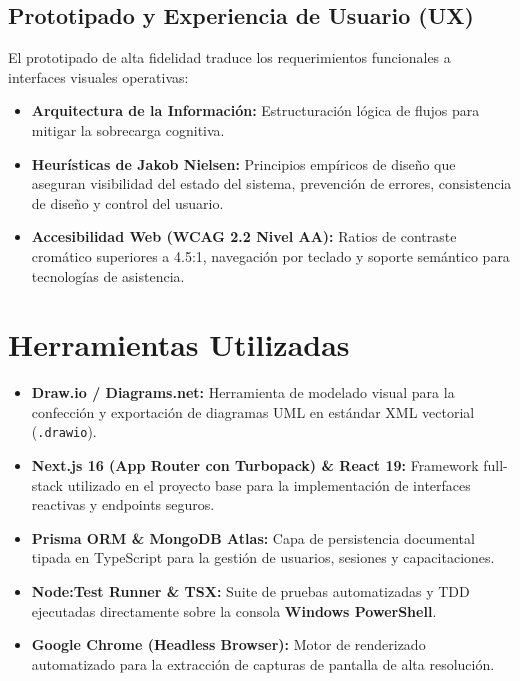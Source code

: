 \documentclass[11pt,a4paper]{article}
\begin{document}
\subsection{Prototipado y Experiencia de Usuario (UX)}
El prototipado de alta fidelidad traduce los requerimientos funcionales a interfaces visuales operativas:
\begin{itemize}[leftmargin=*]
    \item \textbf{Arquitectura de la Información:} Estructuración lógica de flujos para mitigar la sobrecarga cognitiva.
    \item \textbf{Heurísticas de Jakob Nielsen:} Principios empíricos de diseño que aseguran visibilidad del estado del sistema, prevención de errores, consistencia de diseño y control del usuario.
    \item \textbf{Accesibilidad Web (WCAG 2.2 Nivel AA):} Ratios de contraste cromático superiores a 4.5:1, navegación por teclado y soporte semántico para tecnologías de asistencia.
\end{itemize}

\section{Herramientas Utilizadas}
\begin{itemize}[leftmargin=*]
    \item \textbf{Draw.io / Diagrams.net:} Herramienta de modelado visual para la confección y exportación de diagramas UML en estándar XML vectorial (\texttt{.drawio}).
    \item \textbf{Next.js 16 (App Router con Turbopack) \& React 19:} Framework full-stack utilizado en el proyecto base para la implementación de interfaces reactivas y endpoints seguros.
    \item \textbf{Prisma ORM \& MongoDB Atlas:} Capa de persistencia documental tipada en TypeScript para la gestión de usuarios, sesiones y capacitaciones.
    \item \textbf{Node:Test Runner \& TSX:} Suite de pruebas automatizadas y TDD ejecutadas directamente sobre la consola \textbf{Windows PowerShell}.
    \item \textbf{Google Chrome (Headless Browser):} Motor de renderizado automatizado para la extracción de capturas de pantalla de alta resolución.
\end{itemize}
\end{document}
